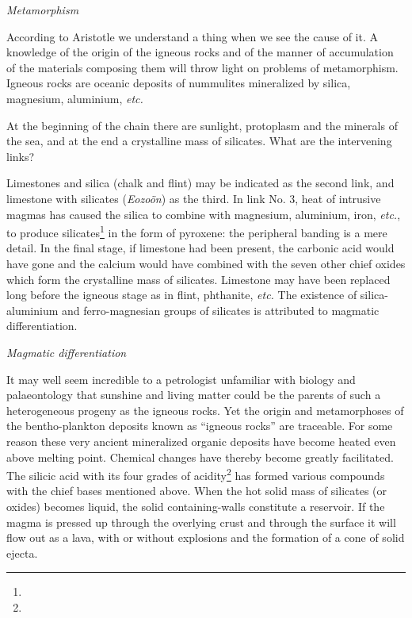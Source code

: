 \documentclass[a4paper, 12pt, oneside]{article}
\begin{document}
\bigskip
\centerline{\emph{Metamorphism}}

According to Aristotle we understand a thing when we see the cause of it. A knowledge of the origin of the igneous rocks and of the manner of accumulation of the materials composing them will throw light on problems of metamorphism. Igneous rocks are oceanic deposits of nummulites mineralized by silica, magnesium, aluminium, \emph{etc.}

At the beginning of the chain there are sunlight, protoplasm and the minerals of the sea, and at the end a crystalline mass of silicates. What are the intervening links?

Limestones and silica (chalk and flint) may be indicated as the second link, and limestone with silicates (\emph{Eozoön}) as the third. In link No. 3, heat of intrusive magmas has caused the silica to combine with magnesium, aluminium, iron, \emph{etc.}, to produce silicates\footnote{} in the form of pyroxene: the peripheral banding is a mere detail. In the final stage, if limestone had been present, the carbonic acid would have gone and the calcium would have combined with the seven other chief oxides which form the crystalline mass of silicates. Limestone may have been replaced long before the igneous stage as in flint, phthanite, \emph{etc.} The existence of silica-aluminium and ferro-magnesian groups of silicates is attributed to magmatic differentiation.

\bigskip
\centerline{\emph{Magmatic differentiation}}

It may well seem incredible to a petrologist unfamiliar with biology and palaeontology that sunshine and living matter could be the parents of such a heterogeneous progeny as the igneous rocks. Yet the origin and metamorphoses of the bentho-plankton deposits known as ``igneous rocks'' are traceable. For some reason these very ancient mineralized organic deposits have become heated even above melting point. Chemical changes have thereby become greatly facilitated. The silicic acid with its four grades of acidity\footnote{} has formed various compounds with the chief bases mentioned above. When the hot solid mass of silicates (or oxides) becomes liquid, the solid containing-walls constitute a reservoir. If the magma is pressed up through the overlying crust and through the surface it will flow out as a lava, with or without explosions and the formation of a cone of solid ejecta.
\end{document}
